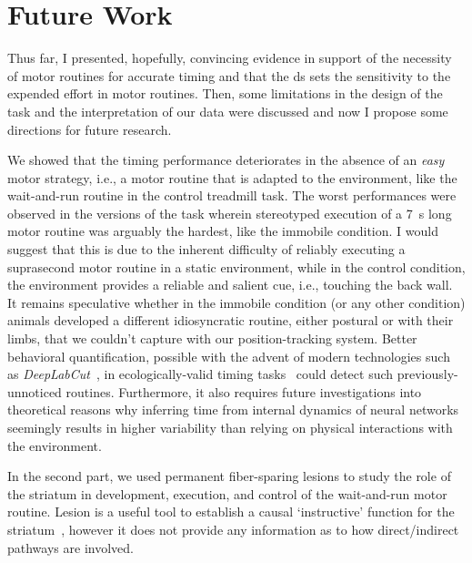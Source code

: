 \section{Future Work}
Thus far, I presented, hopefully, convincing evidence in support of the necessity of motor routines for accurate timing and that the \gls{ds} sets the sensitivity to the expended effort in motor routines.
Then, some limitations in the design of the task and the interpretation of our data were discussed and now I propose some directions for future research.
\par
We showed that the timing performance deteriorates in the absence of an \textit{easy} motor strategy, i.e., a motor routine that is adapted to the environment, like the wait-and-run routine in the control treadmill task.
The worst performances were observed in the versions of the task wherein stereotyped execution of a 7~s long motor routine was arguably the hardest, like the immobile condition.
I would suggest that this is due to the inherent difficulty of reliably executing a suprasecond motor routine in a static environment, while in the control condition, the environment provides a reliable and salient cue, i.e., touching the back wall.
It remains speculative whether in the immobile condition (or any other condition) animals developed a different idiosyncratic routine, either postural or with their limbs, that we couldn't capture with our position-tracking system.
Better behavioral quantification, possible with the advent of modern technologies such as \textit{DeepLabCut}~\cite{DeepLabCut2018NN}, in ecologically-valid timing tasks~\cite{VanRijn2018TICS} could detect such previously-unnoticed routines.
Furthermore, it also requires future investigations into theoretical reasons why inferring time from internal dynamics of neural networks seemingly results in higher variability than relying on physical interactions with the environment.
\par
In the second part, we used permanent fiber-sparing lesions to study the role of the striatum in development, execution, and control of the wait-and-run motor routine.
Lesion is a useful tool to establish a causal `instructive' function for the striatum~\cite{Otchy2015Nature}, however it does not provide any information as to how direct/indirect pathways are involved.
